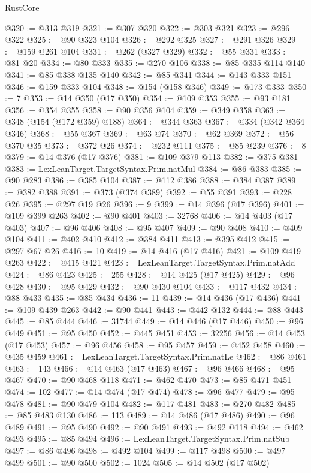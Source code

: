 \begin{lexlean}{RustCore}
\begin{coremodule}
@320 := @313 @319
@321 := @307 @320
@322 := @303 @321
@323 := @296 @322
@325 := @90 @323 @104
@326 := @292 @325
@327 := @291 @326
@329 := @159 @261 @104
@331 := @262 (@327 @329)
@332 := @55 @331
@333 := @81 @20
@334 := @80 @333
@335 := @270 @106
@338 := @85 @335 @114 @140
@341 := @85 @338 @135 @140
@342 := @85 @341
@344 := @143 @333 @151
@346 := @159 @333 @104
@348 := @154 (@158 @346)
@349 := @173 @333
@350 := 7
@353 := @14 @350 (@17 @350)
@354 := @109 @353
@355 := @93 @181
@356 := @354 @355
@358 := @90 @356 @104
@359 := @349 @358
@363 := @348 (@154 (@172 @359) @188)
@364 := @344 @363
@367 := @334 (@342 @364 @346)
@368 := @55 @367
@369 := @63 @74
@370 := @62 @369
@372 := @56 @370 @35
@373 := @372 @26
@374 := @232 @111
@375 := @85 @239
@376 := 8
@379 := @14 @376 (@17 @376)
@381 := @109 @379 @113
@382 := @375 @381
@383 := LexLeanTarget.TargetSyntax.Prim.natMul
@384 := @86 @383
@385 := @90 @283
@386 := @385 @104
@387 := @112 @386
@388 := @384 @387
@389 := @382 @388
@391 := @373 (@374 @389)
@392 := @55 @391
@393 := @228 @26
@395 := @297 @19 @26
@396 := 9
@399 := @14 @396 (@17 @396)
@401 := @109 @399 @263
@402 := @90 @401
@403 := 32768
@406 := @14 @403 (@17 @403)
@407 := @96 @406
@408 := @95 @407
@409 := @90 @408
@410 := @409 @104
@411 := @402 @410
@412 := @384 @411
@413 := @395 @412
@415 := @297 @67 @26
@416 := 10
@419 := @14 @416 (@17 @416)
@421 := @109 @419 @263
@422 := @415 @421
@423 := LexLeanTarget.TargetSyntax.Prim.natAdd
@424 := @86 @423
@425 := 255
@428 := @14 @425 (@17 @425)
@429 := @96 @428
@430 := @95 @429
@432 := @90 @430 @104
@433 := @117 @432
@434 := @88 @433
@435 := @85 @434
@436 := 11
@439 := @14 @436 (@17 @436)
@441 := @109 @439 @263
@442 := @90 @441
@443 := @442 @132
@444 := @88 @443
@445 := @85 @444
@446 := 31744
@449 := @14 @446 (@17 @446)
@450 := @96 @449
@451 := @95 @450
@452 := @445 @451
@453 := 32256
@456 := @14 @453 (@17 @453)
@457 := @96 @456
@458 := @95 @457
@459 := @452 @458
@460 := @435 @459
@461 := LexLeanTarget.TargetSyntax.Prim.natLe
@462 := @86 @461
@463 := 143
@466 := @14 @463 (@17 @463)
@467 := @96 @466
@468 := @95 @467
@470 := @90 @468 @118
@471 := @462 @470
@473 := @85 @471 @451
@474 := 102
@477 := @14 @474 (@17 @474)
@478 := @96 @477
@479 := @95 @478
@481 := @90 @479 @104
@482 := @117 @481
@483 := @270 @482
@485 := @85 @483 @130
@486 := 113
@489 := @14 @486 (@17 @486)
@490 := @96 @489
@491 := @95 @490
@492 := @90 @491
@493 := @492 @118
@494 := @462 @493
@495 := @85 @494
@496 := LexLeanTarget.TargetSyntax.Prim.natSub
@497 := @86 @496
@498 := @492 @104
@499 := @117 @498
@500 := @497 @499
@501 := @90 @500
@502 := 1024
@505 := @14 @502 (@17 @502)

\end{coremodule}
\end{lexlean}
